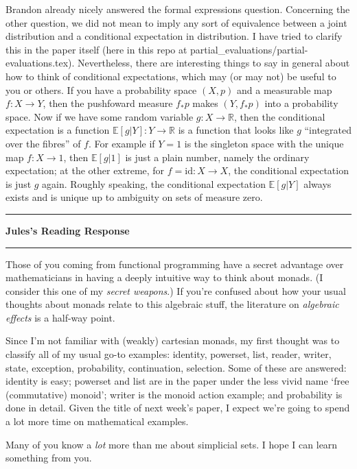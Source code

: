 \documentclass{amsart}
\newcommand{\iam}[1]{
  \vspace{0.25em}
  \hrule
  \vspace{0.25em}
  \textbf{{#1}'s Reading Response}
  \vspace{0.25em}
  \hrule
  \vspace{1em}
}
\begin{document}
Brandon already nicely answered the formal expressions question. Concerning the other question, we did not mean to imply any sort of equivalence between a joint distribution and a conditional expectation in distribution. I have tried to clarify this in the paper itself (here in this repo at partial\_evaluations/partial-evaluations.tex). Nevertheless, there are interesting things to say in general about how to think of conditional expectations, which may (or may not) be useful to you or others. If you have a probability space $(X,p)$ and a measurable map $f : X \to Y$, then the pushfoward measure $f_*p$ makes $(Y,f_*p)$ into a probability space. Now if we have some random variable $g : X \to \mathbb{R}$, then the conditional expectation is a function $\mathbb{E}[g|Y] : Y \to \mathbb{R}$ is a function that looks like $g$ ``integrated over the fibres'' of $f$. For example if $Y = 1$ is the singleton space with the unique map $f : X \to 1$, then $\mathbb{E}[g|1]$ is just a plain number, namely the ordinary expectation; at the other extreme, for $f = \mathrm{id} : X \to X$, the conditional expectation is just $g$ again. Roughly speaking, the conditional expectation $\mathbb{E}[g|Y]$ always exists and is unique up to ambiguity on sets of measure zero.

\iam{Jules} Those of you coming from functional programming have a secret advantage over mathematicians in having a deeply intuitive way to think about monads. (I consider this one of my \emph{secret weapons}.) If you're confused about how your usual thoughts about monads relate to this algebraic stuff, the literature on \emph{algebraic effects} is a half-way point.

Since I'm not familiar with (weakly) cartesian monads, my first thought was to classify all of my usual go-to examples: identity, powerset, list, reader, writer, state, exception, probability, continuation, selection. Some of these are answered: identity is easy; powerset and list are in the paper under the less vivid name `free (commutative) monoid'; writer is the monoid action example; and probability is done in detail. Given the title of next week's paper, I expect we're going to spend a lot more time on mathematical examples.

Many of you know a \emph{lot} more than me about simplicial sets. I hope I can learn something from you.
\end{document}
